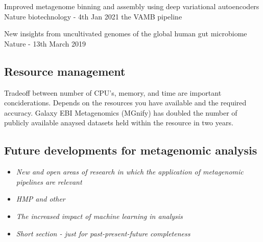 \documentclass{article}
\begin{document}
Improved metagenome binning and assembly using deep variational autoencoders
Nature biotechnology - 4th Jan 2021
the VAMB pipeline \cite{nissenimproved}

New insights from uncultivated genomes of the global human gut microbiome
Nature - 13th March 2019 \cite{nayfach2019new}

\subsection{Resource management}
Tradeoff between number of CPU's, memory, and time are important conciderations.
Depends on the resources you have available and the required accuracy.
Galaxy
EBI Metagenomics (MGnify) has doubled the number of publicly available anaysed datasets held within the resource in two years.

\subsection{Future developments for metagenomic analysis}
\begin{itemize}
	\item \emph{New and open areas of research in which the application of metagenomic pipelines are relevant}
	\item \emph{HMP and other }
	\item \emph{The increased impact of machine learning in analysis}
	\item \emph{Short section - just for past-present-future completeness}
\end{itemize}

\end{document}
